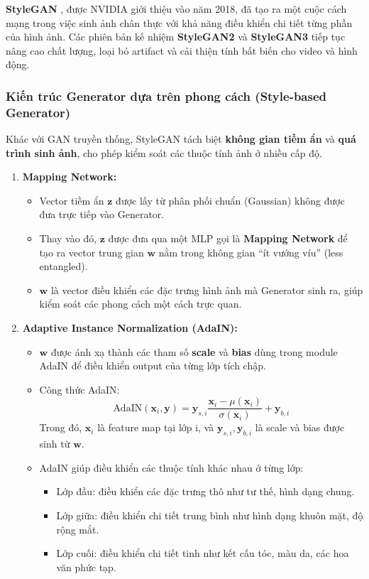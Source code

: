 \textbf{StyleGAN} \cite{Karras2019}, được NVIDIA giới thiệu vào năm 2018, đã tạo ra một cuộc cách mạng trong việc sinh ảnh chân thực với khả năng điều khiển chi tiết từng phần của hình ảnh. Các phiên bản kế nhiệm \textbf{StyleGAN2} và \textbf{StyleGAN3} tiếp tục nâng cao chất lượng, loại bỏ artifact và cải thiện tính bất biến cho video và hình động.

\subsubsection{Kiến trúc Generator dựa trên phong cách (Style-based Generator)}

Khác với GAN truyền thống, StyleGAN tách biệt \textbf{không gian tiềm ẩn} và \textbf{quá trình sinh ảnh}, cho phép kiểm soát các thuộc tính ảnh ở nhiều cấp độ.

\begin{enumerate}
	\item \textbf{Mapping Network:} 
	\begin{itemize}
		\item Vector tiềm ẩn $\mathbf{z}$ được lấy từ phân phối chuẩn (Gaussian) không được đưa trực tiếp vào Generator.
		\item Thay vào đó, $\mathbf{z}$ được đưa qua một MLP gọi là \textbf{Mapping Network} để tạo ra vector trung gian $\mathbf{w}$ nằm trong không gian “ít vướng víu” (less entangled). 
		\item $\mathbf{w}$ là vector điều khiển các đặc trưng hình ảnh mà Generator sinh ra, giúp kiểm soát các phong cách một cách trực quan.
	\end{itemize}
	
	\item \textbf{Adaptive Instance Normalization (AdaIN):} 
	\begin{itemize}
		\item $\mathbf{w}$ được ánh xạ thành các tham số \textbf{scale} và \textbf{bias} dùng trong module AdaIN để điều khiển output của từng lớp tích chập.
		\item Công thức AdaIN:
		\begin{equation}
			\text{AdaIN}(\mathbf{x}_i, \mathbf{y}) = \mathbf{y}_{s,i} \frac{\mathbf{x}_i - \mu(\mathbf{x}_i)}{\sigma(\mathbf{x}_i)} + \mathbf{y}_{b,i}
		\end{equation}
		Trong đó, $\mathbf{x}_i$ là feature map tại lớp i, và $\mathbf{y}_{s,i}, \mathbf{y}_{b,i}$ là scale và bias được sinh từ $\mathbf{w}$.
		\item AdaIN giúp điều khiển các thuộc tính khác nhau ở từng lớp: 
		\begin{itemize}
			\item Lớp đầu: điều khiển các đặc trưng thô như tư thế, hình dạng chung. 
			\item Lớp giữa: điều khiển chi tiết trung bình như hình dạng khuôn mặt, độ rộng mắt. 
			\item Lớp cuối: điều khiển chi tiết tinh như kết cấu tóc, màu da, các hoa văn phức tạp.
		\end{itemize}
	\end{itemize}
\end{enumerate}

